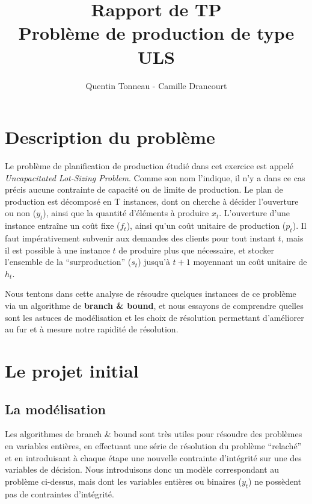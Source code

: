 \documentclass[a4paper,11pt,twoside]{report}
\title {Rapport de TP \\ Problème de production de type ULS}
\author {Quentin Tonneau - Camille Drancourt}
\date{}
\begin{document}
\tableofcontents
\newpage

\chapter{Description du problème}
Le problème de planification de production étudié dans cet exercice est appelé \textit{Uncapacitated Lot-Sizing Problem}. Comme son nom l'indique, il n'y a dans ce cas précis aucune contrainte de capacité ou de limite de production.
Le plan de production est décomposé en T instances, dont on cherche à décider l'ouverture ou non ($y_t$), ainsi que la quantité d'éléments à produire $x_t$. L'ouverture d'une instance entraîne un coût fixe ($f_t$), ainsi qu'un coût unitaire de production ($p_t$).
Il faut impérativement subvenir aux demandes des clients pour tout instant $t$, mais il est possible à une instance $t$ de produire plus que nécessaire, et stocker l'ensemble de la ``surproduction'' ($s_t$) jusqu'à $t+1$ moyennant un coût unitaire de $h_t$.


Nous tentons dans cette analyse de résoudre quelques instances de ce problème via un algorithme de \textbf{branch \& bound}, et nous essayons de comprendre quelles sont les astuces de modélisation et les choix de résolution permettant d'améliorer au fur et à mesure notre rapidité de résolution.

\chapter{Le projet initial}
\section{La modélisation}
Les algorithmes de branch \& bound sont très utiles pour résoudre des problèmes en variables entières, en effectuant une série de résolution du problème ``relaché'' et en introduisant à chaque étape une nouvelle contrainte d'intégrité sur une des variables de décision.
Nous introduisons donc un modèle correspondant au problème ci-dessus, mais dont les variables entières ou binaires ($y_t$) ne possèdent pas de contraintes d’intégrité.
\end{document}
